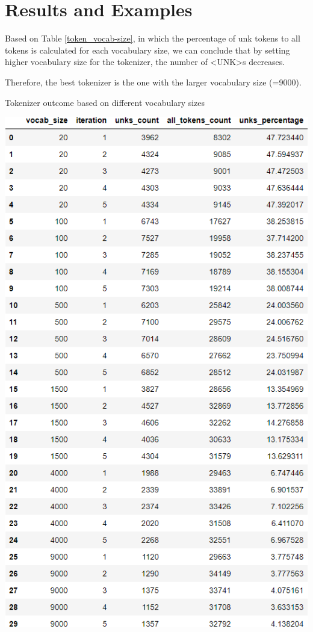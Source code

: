 \documentclass[12pt, a4paper]{article}
\begin{document}
\section*{Results and Examples}
Based on Table \ref{token_vocab-size}, in which the percentage of unk tokens to all tokens is calculated for each vocabulary size, we can conclude that by setting higher vocabulary size for the tokenizer, the number of <UNK>s decreases.

Therefore, the best tokenizer is the one with the larger vocabulary size (=9000).

\begin{table}[H]
	\caption{Tokenizer outcome based on different vocabulary sizes} 
	\centering 
	\vspace{5mm} 
	\includegraphics[width=\linewidth]{../reports/images/token_vocab-size.png}
	\label{token_vocab-size} 
\end{table}
\end{document}
